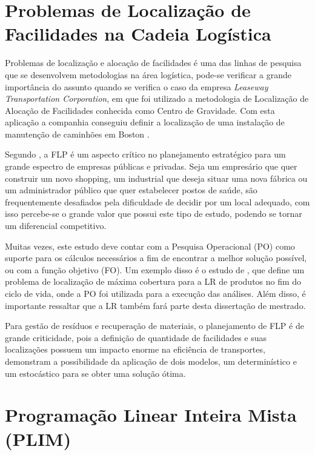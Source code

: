 \section{Problemas de Localização de Facilidades na Cadeia Logística}\label{Problemas de localização e alocação de facilidades na cadeia logística}
Problemas de localização e alocação de facilidades é uma das linhas de pesquisa que se desenvolvem metodologias na área logística, pode-se verificar a grande importância do assunto quando se verifica o caso da empresa \emph{Leaseway Transportation Corporation}, em que foi utilizado a metodologia de Localização de Alocação de Facilidades conhecida como Centro de Gravidade. Com esta aplicação a companhia conseguiu definir a localização de uma instalação de manutenção de caminhões em Boston \cite{ballou2006gerenciamento}.

Segundo , a FLP é um aspecto crítico no planejamento estratégico para um grande espectro de empresas públicas e privadas. Seja um empresário que quer construir um novo shopping, um industrial que deseja situar uma nova fábrica ou um administrador público que quer estabelecer postos de saúde, são frequentemente desafiados pela dificuldade de decidir por um local adequado, com isso percebe-se o grande valor que possui este tipo de estudo, podendo se tornar um diferencial competitivo.

Muitas vezes, este estudo deve contar com a Pesquisa Operacional (PO) como suporte para os cálculos necessários a fim de encontrar a melhor solução possível, ou com a função objetivo (FO). Um exemplo disso é o estudo de , que define um problema de localização de máxima cobertura para a LR de produtos no fim do ciclo de vida, onde a PO foi utilizada para a execução das análises. Além disso, é importante ressaltar que a LR também fará parte desta dissertação de mestrado.

Para gestão de resíduos e recuperação de materiais, o planejamento de FLP é de grande criticidade, pois a definição de quantidade de facilidades e suas localizações possuem um impacto enorme na eficiência de transportes,  demonstram a possibilidade da aplicação de dois modelos, um determinístico e um estocástico para se obter uma solução ótima.

\section{Programação Linear Inteira Mista (PLIM)}


